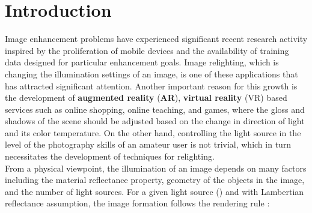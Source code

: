 \documentclass[final]{cvpr}
\begin{document}
\section{Introduction}
Image enhancement problems have experienced significant recent research activity inspired by the proliferation of mobile devices and the availability of training data designed for particular enhancement goals. Image relighting, which is changing the illumination settings of an image, is one of these applications that has attracted significant attention. Another important reason for this growth is the development of \textbf{augmented reality} (\textbf{AR}), \textbf{\textbf{virtual reality}} (VR) based services such as online shopping, online teaching, and games, where the gloss and shadows of the scene should be adjusted based on the change in direction of light and its color temperature. On the other hand, controlling the light source in the level of the photography skills of an amateur user is not trivial, which in turn necessitates the development of techniques for relighting. \\
From a physical viewpoint, the illumination of an image depends on many factors including the material reflectance property, geometry of the objects in the image, and the number of light sources. For a given light source () and with Lambertian reflectance assumption, the image formation follows the rendering rule \cite{34,7}:
\end{document}
